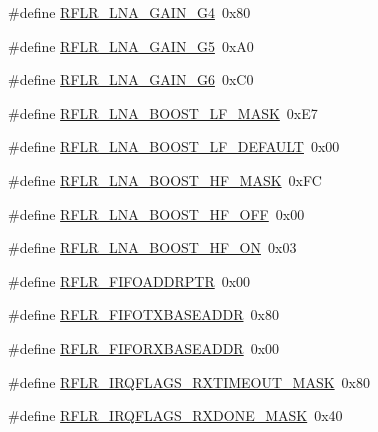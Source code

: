 \begin{DoxyCompactItemize}
\#define \mbox{\hyperlink{sx1276_regs-_lo_ra_8h_a6d72851174c6d7664136736589055129}{R\+F\+L\+R\+\_\+\+L\+N\+A\+\_\+\+G\+A\+I\+N\+\_\+\+G4}}~0x80
\item 
\#define \mbox{\hyperlink{sx1276_regs-_lo_ra_8h_ae5719825fa402e40336c7acac639c5db}{R\+F\+L\+R\+\_\+\+L\+N\+A\+\_\+\+G\+A\+I\+N\+\_\+\+G5}}~0x\+A0
\item 
\#define \mbox{\hyperlink{sx1276_regs-_lo_ra_8h_aa16933aa89f284c5c3e9c3700d717902}{R\+F\+L\+R\+\_\+\+L\+N\+A\+\_\+\+G\+A\+I\+N\+\_\+\+G6}}~0x\+C0
\item 
\#define \mbox{\hyperlink{sx1276_regs-_lo_ra_8h_ace13d78a7979a589c7b3918412bb7140}{R\+F\+L\+R\+\_\+\+L\+N\+A\+\_\+\+B\+O\+O\+S\+T\+\_\+\+L\+F\+\_\+\+M\+A\+SK}}~0x\+E7
\item 
\#define \mbox{\hyperlink{sx1276_regs-_lo_ra_8h_a952b2dd390b6b2faff709e9950c7bdbf}{R\+F\+L\+R\+\_\+\+L\+N\+A\+\_\+\+B\+O\+O\+S\+T\+\_\+\+L\+F\+\_\+\+D\+E\+F\+A\+U\+LT}}~0x00
\item 
\#define \mbox{\hyperlink{sx1276_regs-_lo_ra_8h_a0276e7bb160dc7aeb54faf11570caee6}{R\+F\+L\+R\+\_\+\+L\+N\+A\+\_\+\+B\+O\+O\+S\+T\+\_\+\+H\+F\+\_\+\+M\+A\+SK}}~0x\+FC
\item 
\#define \mbox{\hyperlink{sx1276_regs-_lo_ra_8h_ab97ab7086b3dd953fa82bcf76347f433}{R\+F\+L\+R\+\_\+\+L\+N\+A\+\_\+\+B\+O\+O\+S\+T\+\_\+\+H\+F\+\_\+\+O\+FF}}~0x00
\item 
\#define \mbox{\hyperlink{sx1276_regs-_lo_ra_8h_af8786c60c42323ea89f1c133e9d82c43}{R\+F\+L\+R\+\_\+\+L\+N\+A\+\_\+\+B\+O\+O\+S\+T\+\_\+\+H\+F\+\_\+\+ON}}~0x03
\item 
\#define \mbox{\hyperlink{sx1276_regs-_lo_ra_8h_a293258103cd0271149fc3ddbc2eb37a2}{R\+F\+L\+R\+\_\+\+F\+I\+F\+O\+A\+D\+D\+R\+P\+TR}}~0x00
\item 
\#define \mbox{\hyperlink{sx1276_regs-_lo_ra_8h_ace89be0e3d72b0aa238de31aa1840fd3}{R\+F\+L\+R\+\_\+\+F\+I\+F\+O\+T\+X\+B\+A\+S\+E\+A\+D\+DR}}~0x80
\item 
\#define \mbox{\hyperlink{sx1276_regs-_lo_ra_8h_af2f960ed320739991501681945e45b7e}{R\+F\+L\+R\+\_\+\+F\+I\+F\+O\+R\+X\+B\+A\+S\+E\+A\+D\+DR}}~0x00
\item 
\#define \mbox{\hyperlink{sx1276_regs-_lo_ra_8h_ab60607459cabba892de2c685a14786ff}{R\+F\+L\+R\+\_\+\+I\+R\+Q\+F\+L\+A\+G\+S\+\_\+\+R\+X\+T\+I\+M\+E\+O\+U\+T\+\_\+\+M\+A\+SK}}~0x80
\item 
\#define \mbox{\hyperlink{sx1276_regs-_lo_ra_8h_aaed938b05c39afb8a66f7abc7bd31a9e}{R\+F\+L\+R\+\_\+\+I\+R\+Q\+F\+L\+A\+G\+S\+\_\+\+R\+X\+D\+O\+N\+E\+\_\+\+M\+A\+SK}}~0x40

\end{DoxyCompactItemize}
